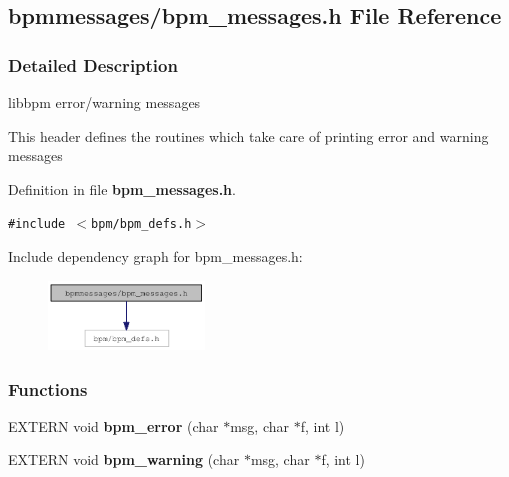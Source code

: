 \subsection{bpmmessages/bpm\_\-messages.h File Reference}
\label{bpm__messages_8h}


\subsubsection{Detailed Description}
libbpm error/warning messages 

This header defines the routines which take care of printing error and warning messages 

Definition in file {\bf bpm\_\-messages.h}.

{\tt \#include $<$bpm/bpm\_\-defs.h$>$}\par


Include dependency graph for bpm\_\-messages.h:\nopagebreak
\begin{figure}[H]
\begin{center}
\leavevmode
\includegraphics[width=118pt]{bpm__messages_8h__incl}
\end{center}
\end{figure}
\subsubsection*{Functions}
\begin{CompactItemize}
\item 
EXTERN void {\bf bpm\_\-error} (char $\ast$msg, char $\ast$f, int l)
\item 
EXTERN void {\bf bpm\_\-warning} (char $\ast$msg, char $\ast$f, int l)
\end{CompactItemize}
